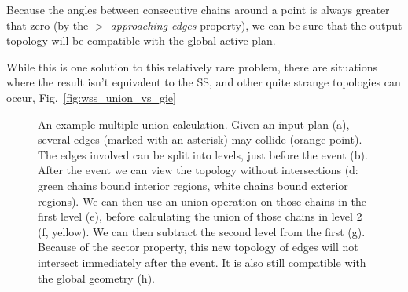 Because the angles between consecutive chains around a point is always greater that zero (by the \emph{$>$ approaching edges} property), we can be sure that the output topology will be compatible with the global active plan.

While this is one solution to this relatively rare problem, there are situations where the result isn't equivalent to the SS, and other quite strange topologies can occur, Fig.~\ref{fig:wss_union_vs_gie}

\begin{figure}
  \centering
  \def\svgwidth{1.0\columnwidth}
  
  \caption[A multiple union calculation]{\label{fig:wss_gie_example} An example multiple union calculation. Given an input plan (a), several edges (marked with an asterisk) may collide (orange point). The edges involved can be split into levels, just before the event (b). After the event we can view the topology without intersections (d: green chains bound interior regions, white chains bound exterior regions). We can then use an union operation on those chains in the first level (e), before calculating the union of those chains in level 2 (f, yellow). We can then subtract the second level from the first (g). Because of the sector property, this new topology of edges will not intersect immediately after the event. It is also still compatible with the global geometry (h).}
\end{figure}
